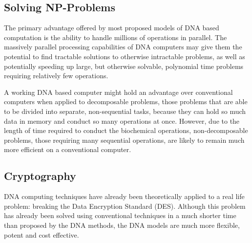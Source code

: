 \subsection{Solving NP-Problems} %
\label{sub:subsection_name}
The primary advantage offered by most proposed models of DNA based computation is the ability to handle millions of operations in parallel. The massively parallel processing capabilities of DNA computers may give them the potential to find tractable solutions to otherwise intractable problems, as well as potentially speeding up large, but otherwise solvable, polynomial time problems requiring relatively few operations.

A working DNA based computer might hold an advantage over conventional computers when applied to decomposable problems, those problems that are able to be divided into separate, non-sequential tasks, because they can hold so much data in memory and conduct so many operations at once. However, due to the length of time required to conduct the biochemical operations, non-decomposable problems, those requiring many sequential operations, are likely to remain much more efficient on a conventional computer. 
\subsection{Cryptography} %
\label{sub:subsection_name}
 DNA computing techniques have already been theoretically applied to a real life problem: breaking the Data Encryption Standard (DES). Although this problem has already been solved using conventional techniques in a much shorter time than proposed by the DNA methods, the DNA models are much more flexible, potent and  cost effective.

